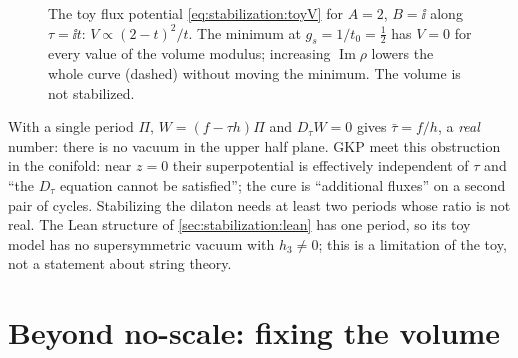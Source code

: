 \begin{figure}[t]
\centering
{}
\caption{The toy flux potential \eqref{eq:stabilization:toyV} for $A=2$, $B=\ii$ along
$\tau=\ii t$: $V\propto(2-t)^2/t$. The minimum at $g_s=1/t_0=\tfrac12$ has $V=0$ for every
value of the volume modulus; increasing $\operatorname{Im}\rho$ lowers the whole curve (dashed)
without moving the minimum. The volume is not stabilized.}\label{fig:stabilization:toy}
\end{figure}

\begin{pitfallbox}
With a single period $\Pi$, $W=(f-\tau h)\Pi$ and $D_\tau W=0$ gives $\bar\tau=f/h$, a
\emph{real} number: there is no vacuum in the upper half plane. GKP meet this obstruction in the
conifold: near $z=0$ their superpotential is effectively independent of $\tau$ and ``the
$D_\tau$ equation cannot be satisfied''; the cure is ``additional fluxes'' on a second pair of
cycles.  Stabilizing the dilaton needs at least two periods
whose ratio is not real. The Lean structure  of
\cref{sec:stabilization:lean} has one period, so its toy model has no supersymmetric vacuum
with $h_3\neq0$; this is a limitation of the toy, not a statement about string theory.
\end{pitfallbox}

\section{Beyond no-scale: fixing the volume}\label{sec:stabilization:kklt}

